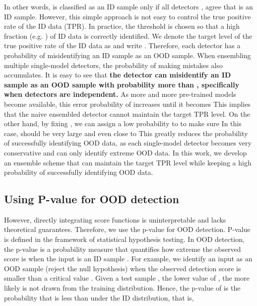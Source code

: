\documentclass{article} \usepackage{iclr2023_conference,times}
\begin{document}
In other words,  is classified as an ID sample only if all detectors ,   agree that  is an ID sample.
However, this simple approach is not easy to control the true positive rate of the ID data (TPR). In practice, the threshold  is chosen so that a high fraction (e.g. ) of ID data is correctly identified. 
We denote the target level of the true positive rate of the ID data as  and write . 
Therefore, each detector  has a  probability of misidentifying an ID sample as an OOD sample.
When ensembling multiple single-model detectors, the probability of making mistakes also accumulates.
It is easy to see that {\bf the detector  can misidentify an ID sample as an OOD sample with probability more than , specifically  when detectors are independent.}
As more and more pre-trained models become available, this error probability of  increases until it becomes  
This implies that the naive ensembled detector cannot maintain the target TPR level. 
On the other hand, by fixing , we can assign a low probability to  to make sure 
In this case,  should be very large and even close to 
This greatly reduces the probability of successfully identifying OOD data, as each single-model detector becomes very conservative and can only identify extreme OOD data. 
In this work, we develop an ensemble scheme that can maintain the target TPR level while keeping a high probability of successfully identifying OOD data.


\subsection{Using P-value for OOD detection}\label{sec32}

However, directly integrating score functions is uninterpretable and lacks theoretical guarantees.
Therefore, we use the p-value for OOD detection.
P-value \citep{abramovich2013statistical} is defined in the framework of statistical hypothesis testing.
In OOD detection, the p-value is a probability measure that quantifies how extreme the observed score is when the input is an ID sample \citep{cai2020real,morningstar2021density,haroush2021statistical,bergamin2022model,magesh2022multiple,kaur2022idecode}.
For example, we identify an input  as an OOD sample (reject the null hypothesis) when the observed detection score  is smaller than a critical value .
Given a test sample , the lower value of , the more likely  is not drawn from the training distribution. Hence, the p-value of  is the probability that  is less than   under the ID distribution, that is, 
\end{document}

